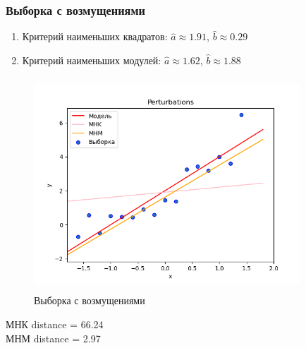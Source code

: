 \subsubsection{Выборка с возмущениями}
\begin{enumerate}
	\item{Критерий наименьших квадратов:}
	$\hat{a}\approx 1.91$, $\hat{b}\approx 0.29$
	\item{Критерий наименьших модулей:}
	$\hat{a}\approx 1.62$, $\hat{b}\approx 1.88$
\end{enumerate}
\begin{figure}[H]
	\centering
	\includegraphics[width = 10cm, height = 8cm]{pics/Perturbations.png}
	\caption{Выборка с возмущениями}
	\label{w_pert}
\end{figure}
МНК distance = 66.24 \\
МНМ distance = 2.97


